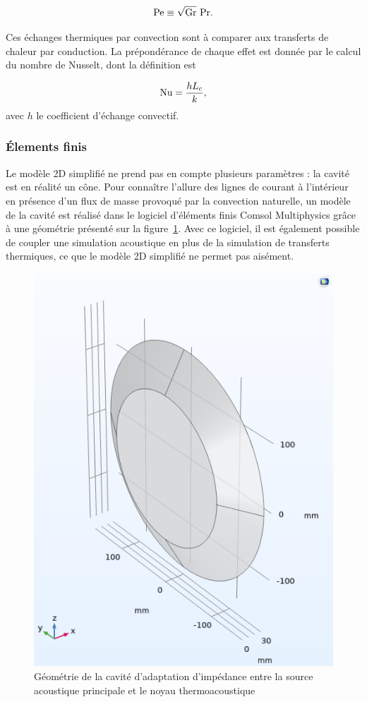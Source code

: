\begin{equation}
	\mathrm{Pe} \equiv \sqrt{\mathrm{Gr}}~\mathrm{Pr}.
	\label{eq:NbrPeclet_GrashofFoisPrandtl}
\end{equation}

Ces échanges thermiques par convection sont à comparer aux transferts de chaleur par conduction. La prépondérance de chaque effet est donnée par le calcul du nombre de Nusselt, dont la définition est

\begin{equation}
	\mathrm{Nu} = \frac{h L_c}{k},
\end{equation}
avec $h$ le coefficient d'échange convectif.


\subsubsection{\'Elements finis}
Le modèle 2D simplifié ne prend pas en compte plusieurs paramètres : la cavité est en réalité un cône. Pour connaître l'allure des lignes de courant à l'intérieur en présence d'un flux de masse provoqué par la convection naturelle, un modèle de la cavité est réalisé dans le logiciel d'éléments finis Comsol Multiphysics grâce à une géométrie présenté sur la figure~\ref{fig:CaviteConvNat_ComsolGeometrie}. Avec ce logiciel, il est également possible de coupler une simulation acoustique en plus de la simulation de transferts thermiques, ce que le modèle 2D simplifié ne permet pas aisément.

\begin{figure}[!ht]
    \centering
    \includegraphics[width=.5\textwidth]{../fig/fig_ConvNatComsol/Geometry.png}
    \caption{Géométrie de la cavité d'adaptation d'impédance entre la source acoustique principale et le noyau thermoacoustique}
    \label{fig:CaviteConvNat_ComsolGeometrie}
\end{figure}

